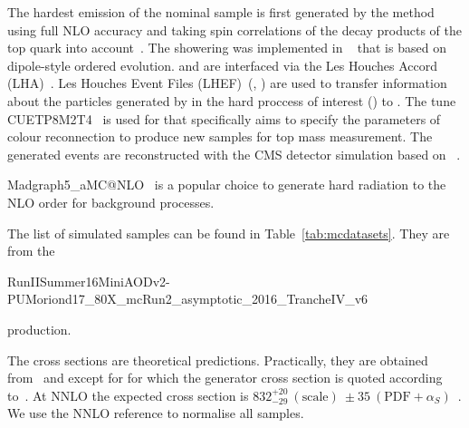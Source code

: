 The hardest emission of the nominal \ttbar sample is first generated by the \POWHEG method~\cite{Frixione:2007vw} using full NLO accuracy and taking spin correlations of the decay products of the top quark into account~\cite{Frixione:2007nw}. The showering was implemented in ~\cite{Sjostrand:2014zea} that is based on dipole-style \pt ordered evolution. \POWHEG and  are interfaced via the Les Houches Accord (LHA)~\cite{Boos:2001cv}. Les Houches Event Files (LHEF)~(\cite{Alwall:2006yp}, \cite{Andersen:2014efa}) are used to transfer information about the particles generated by \POWHEG in the hard proccess of interest (\ttbar) to . The tune CUETP8M2T4~\cite{Kovalchuk:CR} is used for  that specifically aims to specify the parameters of colour reconnection to produce new samples for top mass measurement. The generated events are reconstructed with the CMS detector simulation based on \GEANTfour~\cite{Agostinelli:2002hh}.

Madgraph5\_aMC@NLO~\cite{Alwall:2014hca} is a popular choice to generate hard radiation to the NLO order for background processes. 

The list of simulated samples can be found in Table~\ref{tab:mcdatasets}. They are from the

RunIISummer16MiniAODv2-PUMoriond17\_80X\_mcRun2\_asymptotic\_2016\_TrancheIV\_v6

production.

The cross sections are theoretical predictions. Practically, they are obtained from~\cite{twiki:SingleTopRefXsec} and \cite{twiki:SM13} except for \ttbar for which the generator cross section is quoted according to~\cite{site:MCM}. At NNLO the expected \ttbar cross section is $832^{+20}_{-29}~(\text{scale})~\pm 35~(\text{PDF}+\alpha_S)$~\cite{twiki:TTbarNLO}. We use the NNLO reference to normalise all \ttbar samples.

